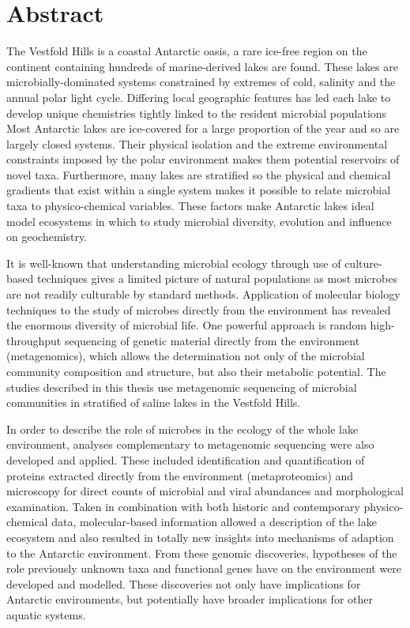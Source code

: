 \chapter*{Abstract}

The Vestfold Hills is a coastal Antarctic oasis, a rare ice-free region on the continent containing hundreds of marine-derived lakes are found.
These lakes are microbially-dominated systems constrained by extremes of cold, salinity and the annual polar light cycle.
Differing local geographic features has led each lake to develop unique chemistries tightly linked to the resident microbial populations
Most Antarctic lakes are ice-covered for a large proportion of the year and so are largely closed systems.
Their physical isolation and the extreme environmental constraints imposed by the polar environment makes them potential reservoirs of novel taxa.
Furthermore, many lakes are stratified so the physical and chemical gradients that exist within a single system makes it possible to relate microbial taxa to physico-chemical variables.
These factors make Antarctic lakes ideal model ecosystems in which to study microbial diversity, evolution and influence on geochemistry.

It is well-known that understanding microbial ecology through use of culture-based techniques gives a limited picture of natural populations as most microbes are not readily culturable by standard methods.
Application of molecular biology techniques to the study of microbes directly from the environment has revealed the enormous diversity of microbial life.
One powerful approach is random high-throughput sequencing of genetic material directly from the environment (metagenomics), which allows the determination not only of the microbial community composition and structure, but also their metabolic potential.
The studies described in this thesis use metagenomic sequencing of microbial communities in stratified of saline lakes in the Vestfold Hills.

In order to describe the role of microbes in the ecology of the whole lake environment, analyses complementary to metagenomic sequencing were also developed and applied.
These included identification and quantification of proteins extracted directly from the environment (metaproteomics) and microscopy for direct counts of microbial and viral abundances and morphological examination.
Taken in combination with both historic and contemporary physico-chemical data, molecular-based information allowed a description of the lake ecosystem and also resulted in totally new insights into mechanisms of adaption to the Antarctic environment.
From these genomic discoveries, hypotheses of the role previously unknown taxa and functional genes have on the environment were developed and modelled.
These discoveries not only have implications for Antarctic environments, but potentially have broader implications for other aquatic systems.





